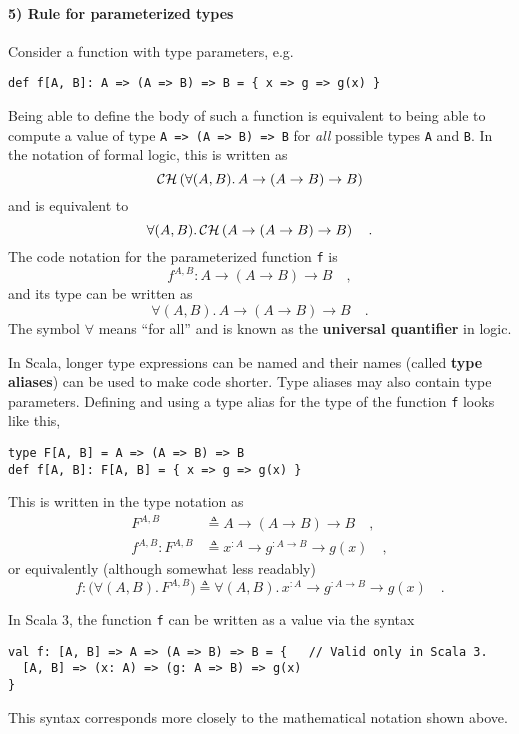 \paragraph{5) Rule for parameterized types}

Consider a function with type parameters, e.g.
\begin{lstlisting}
def f[A, B]: A => (A => B) => B = { x => g => g(x) }
\end{lstlisting}
Being able to define the body of such a function is equivalent to
being able to compute a value of type \lstinline!A => (A => B) => B!
for \emph{all} possible types \lstinline!A! and \lstinline!B!. In
the notation of formal logic, this is written as
\[
{\cal CH}\left(\forall(A,B).\,A\rightarrow(A\rightarrow B)\rightarrow B\right)
\]
and is equivalent to
\[
\forall(A,B).\,{\cal CH}\left(A\rightarrow(A\rightarrow B)\rightarrow B\right)\quad.
\]
The code notation for the parameterized function \lstinline!f! is
\[
f^{A,B}:A\rightarrow\left(A\rightarrow B\right)\rightarrow B\quad,
\]
and its type can be written as
\[
\forall(A,B).\,A\rightarrow\left(A\rightarrow B\right)\rightarrow B\quad.
\]
The symbol $\forall$ means \textsf{``}for all\textsf{''} and is known as the \textbf{universal
quantifier} in logic.

In Scala, longer type expressions can be named and their names (called
\textbf{type aliases}) can be used to make code
shorter. Type aliases may also contain type parameters. Defining and
using a type alias for the type of the function \lstinline!f! looks
like this,
\begin{lstlisting}
type F[A, B] = A => (A => B) => B
def f[A, B]: F[A, B] = { x => g => g(x) }
\end{lstlisting}
This is written in the type notation as
\begin{align*}
F^{A,B} & \triangleq A\rightarrow\left(A\rightarrow B\right)\rightarrow B\quad,\\
f^{A,B}:F^{A,B} & \triangleq x^{:A}\rightarrow g^{:A\rightarrow B}\rightarrow g(x)\quad,
\end{align*}
or equivalently (although somewhat less readably)
\[
f:\big(\forall(A,B).\,F^{A,B}\big)\triangleq\forall(A,B).\,x^{:A}\rightarrow g^{:A\rightarrow B}\rightarrow g(x)\quad.
\]

In Scala 3, the function \lstinline!f! can be written as a value
via the syntax
\begin{lstlisting}
val f: [A, B] => A => (A => B) => B = {   // Valid only in Scala 3.
  [A, B] => (x: A) => (g: A => B) => g(x)
}
\end{lstlisting}
This syntax corresponds more closely to the mathematical notation
shown above.


